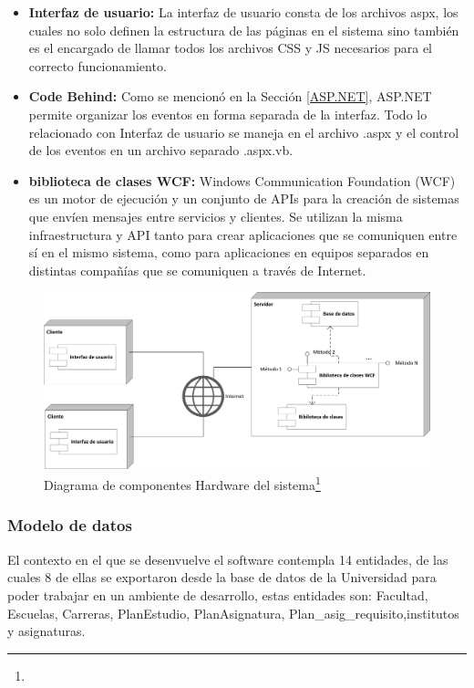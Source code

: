	\begin{itemize}
		\item \textbf{Interfaz de usuario:} La interfaz de usuario  consta de los archivos aspx, los cuales no solo definen la estructura de las páginas en el sistema sino también  es el encargado de llamar todos los archivos CSS y JS necesarios para el correcto funcionamiento.
		
		
		\item \textbf{Code Behind:} Como se mencionó en la Sección \ref{ASP.NET}, ASP.NET permite organizar  los eventos  en forma separada de la interfaz. Todo lo relacionado con Interfaz de usuario se maneja en el archivo .aspx y el control de los eventos en un archivo separado .aspx.vb.
		
		\item \textbf{biblioteca de clases WCF:} Windows Communication Foundation (WCF) es un motor de ejecución y un conjunto de APIs para la creación de sistemas que envíen mensajes entre servicios y clientes. Se utilizan la misma infraestructura y API tanto para crear aplicaciones que se comuniquen entre sí en el mismo sistema, como para aplicaciones en equipos separados en distintas compañías que se comuniquen a través de Internet. 
	\end{itemize}		
			
		\begin{figure}[H]
			\centering
			\includegraphics[width=1\textwidth]{images/Capitulo_3/Componente_HW.png}
			\caption[Diagrama de componentes Hardware del sistema]{Diagrama de componentes Hardware del sistema\footnote{}}
			\label{diagrama_Componente_HW}
		\end{figure}
	\subsubsection{Modelo de datos}
	
	El contexto en el que se desenvuelve el software contempla 14 entidades, de las cuales 8 de ellas se exportaron desde la base de datos de la Universidad para poder trabajar en un ambiente de desarrollo, estas entidades son: Facultad, Escuelas, Carreras, PlanEstudio, PlanAsignatura, Plan\_asig\_requisito,institutos y asignaturas.
	\\
	
